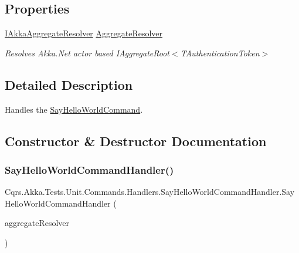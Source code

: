 \subsection*{Properties}
\begin{DoxyCompactItemize}
\item 
\hyperlink{interfaceCqrs_1_1Akka_1_1Domain_1_1IAkkaAggregateResolver}{I\+Akka\+Aggregate\+Resolver} \hyperlink{classCqrs_1_1Akka_1_1Tests_1_1Unit_1_1Commands_1_1Handlers_1_1SayHelloWorldCommandHandler_a4222ccc27f8a550857281bdd97e59b7c_a4222ccc27f8a550857281bdd97e59b7c}{Aggregate\+Resolver}
\begin{DoxyCompactList}\small\item\em Resolves Akka.\+Net actor based I\+Aggregate\+Root$<$\+T\+Authentication\+Token$>$ \end{DoxyCompactList}\end{DoxyCompactItemize}


\subsection{Detailed Description}
Handles the \hyperlink{classCqrs_1_1Akka_1_1Tests_1_1Unit_1_1Commands_1_1SayHelloWorldCommand}{Say\+Hello\+World\+Command}. 



\subsection{Constructor \& Destructor Documentation}
\mbox{\label{classCqrs_1_1Akka_1_1Tests_1_1Unit_1_1Commands_1_1Handlers_1_1SayHelloWorldCommandHandler_a421fd9e6d3c9cbb5e93453675af63de0_a421fd9e6d3c9cbb5e93453675af63de0}} 
\subsubsection{\texorpdfstring{Say\+Hello\+World\+Command\+Handler()}{SayHelloWorldCommandHandler()}}
{\footnotesize\ttfamily Cqrs.\+Akka.\+Tests.\+Unit.\+Commands.\+Handlers.\+Say\+Hello\+World\+Command\+Handler.\+Say\+Hello\+World\+Command\+Handler (\begin{DoxyParamCaption}\item[{\hyperlink{interfaceCqrs_1_1Akka_1_1Domain_1_1IAkkaAggregateResolver}{I\+Akka\+Aggregate\+Resolver}}]{aggregate\+Resolver }\end{DoxyParamCaption})}



